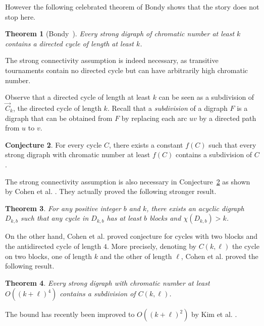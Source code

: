 \documentclass[utf8,10pt]{article}
\theoremstyle{plain}
\newtheorem{theorem}{Theorem}
\theoremstyle{definition}
\newtheorem{conjecture}[theorem]{Conjecture}
\theoremstyle{remark}
\begin{document}
However the following celebrated theorem of Bondy shows that  the story does not stop here.

\begin{theorem}[Bondy~\cite{Bon76}]\label{thm:bondy}
Every strong digraph of chromatic number at least $k$ contains a directed cycle of length at least $k$.
\end{theorem} 

The strong connectivity assumption is indeed necessary, as transitive tournaments contain no directed cycle but can have arbitrarily  high chromatic number. 

Observe that a directed cycle of length at least $k$ can be seen as a subdivision of $\vec{C}_k$, the directed cycle of length $k$.
Recall that a {\it subdivision} of a digraph $F$ is a digraph that can be obtained from $F$ by replacing each arc $uv$ by a directed path from $u$ to $v$.

\begin{conjecture}\label{conj:cycle-sub}
For every cycle $C$, there exists a constant $f(C)$ such that every strong digraph with chromatic number at least $f(C)$ contains a subdivision of $C$.
\end{conjecture}

The strong connectivity assumption is also necessary in Conjecture~\ref{conj:cycle-sub} as shown by Cohen et al.  \cite{CHLN16}. They actually proved the following stronger result.
\begin{theorem}\label{dkb}
For any positive integer $b$ and $k$, there exists an acyclic digraph $D_{k,b}$ such that any cycle in $D_{k,b}$ has at least $b$ blocks and $\chi(D_{k,b}) > k$.
\end{theorem}




On the other hand, Cohen et al.  \cite{CHLN16} proved conjecture for cycles with two blocks and the antidirected cycle of length $4$.
More precisely, denoting by $C(k,\ell)$ the cycle on two blocks, one of length $k$ and the other of length $\ell$,
 Cohen et al. \cite{CHLN16} proved the following result.
\begin{theorem}\label{th:ckl}
Every strong digraph with chromatic number at least $O((k+\ell)^4)$ contains a subdivision of $C(k,\ell)$.
\end{theorem} 
The bound has recently been improved to $O((k+\ell)^2)$  by Kim et al. \cite{KKPM}.  
\end{document}
